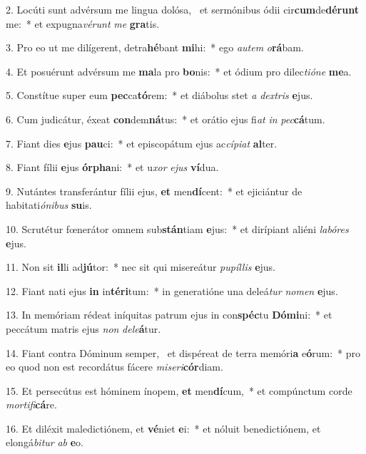 2. Locúti sunt advérsum me lingua dolósa, \dag\  et sermónibus ódii cir\textbf{cum}de\textbf{dé}\textbf{runt} me:~*  et expugna\textit{vé}\textit{runt} \textit{me} \textbf{gra}tis.\

3. Pro eo ut me dilígerent, detra\textbf{hé}bant \textbf{mi}hi:~*  ego \textit{au}\textit{tem} \textit{o}\textbf{rá}bam.\

4. Et posuérunt advérsum me \textbf{ma}la pro \textbf{bo}nis:~*  et ódium pro dilec\textit{ti}\textit{ó}\textit{ne} \textbf{me}a.\

5. Constítue super eum \textbf{pec}ca\textbf{tó}rem:~*  et diábolus stet \textit{a} \textit{dex}\textit{tris} \textbf{e}jus.\

6. Cum judicátur, éxeat \textbf{con}dem\textbf{ná}tus:~*  et orátio ejus fi\textit{at} \textit{in} \textit{pec}\textbf{cá}tum.\

7. Fiant dies \textbf{e}jus \textbf{pau}ci:~*  et episcopátum ejus ac\textit{cí}\textit{pi}\textit{at} \textbf{al}ter.\

8. Fiant fílii \textbf{e}jus \textbf{ór}\textbf{pha}ni:~*  et u\textit{xor} \textit{e}\textit{jus} \textbf{ví}dua.\

9. Nutántes transferántur fílii ejus, \textbf{et} men\textbf{dí}cent:~*  et ejiciántur de habitati\textit{ó}\textit{ni}\textit{bus} \textbf{su}is.\

10. Scrutétur fœnerátor omnem sub\textbf{stán}tiam \textbf{e}jus:~*  et dirípiant aliéni \textit{la}\textit{bó}\textit{res} \textbf{e}jus.\

11. Non sit \textbf{il}li ad\textbf{jú}tor:~*  nec sit qui misereátur \textit{pu}\textit{píl}\textit{lis} \textbf{e}jus.\

12. Fiant nati ejus \textbf{in} in\textbf{tér}\textbf{i}tum:~*  in generatióne una deleá\textit{tur} \textit{no}\textit{men} \textbf{e}jus.\

13. In memóriam rédeat iníquitas patrum ejus in con\textbf{spéc}tu \textbf{Dó}\textbf{mi}ni:~*  et peccátum matris ejus \textit{non} \textit{de}\textit{le}\textbf{á}tur.\

14. Fiant contra Dóminum semper, \dag\  et dispéreat de terra memóri\textbf{a} e\textbf{ó}rum:~*  pro eo quod non est recordátus fácere \textit{mi}\textit{se}\textit{ri}\textbf{cór}diam.\

15. Et persecútus est hóminem ínopem, \textbf{et} men\textbf{dí}cum,~*  et compúnctum corde \textit{mor}\textit{ti}\textit{fi}\textbf{cá}re.\

16. Et diléxit maledictiónem, et \textbf{vé}niet \textbf{e}i:~*  et nóluit benedictiónem, et elongá\textit{bi}\textit{tur} \textit{ab} \textbf{e}o.\

